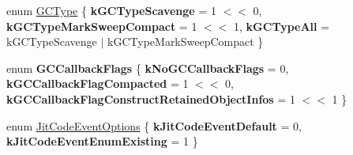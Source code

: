 \begin{DoxyCompactItemize}
\item 
enum \hyperlink{namespacev8_ac109d6f27e0c0f9ef4e98bcf7a806cf2}{G\+C\+Type} \{ {\bfseries k\+G\+C\+Type\+Scavenge} = 1 $<$$<$ 0, 
{\bfseries k\+G\+C\+Type\+Mark\+Sweep\+Compact} = 1 $<$$<$ 1, 
{\bfseries k\+G\+C\+Type\+All} = k\+G\+C\+Type\+Scavenge $\vert$ k\+G\+C\+Type\+Mark\+Sweep\+Compact
 \}
\item 
\hypertarget{namespacev8_a247c37a849f4d6c293b9b16e94e1944b}{}enum {\bfseries G\+C\+Callback\+Flags} \{ {\bfseries k\+No\+G\+C\+Callback\+Flags} = 0, 
{\bfseries k\+G\+C\+Callback\+Flag\+Compacted} = 1 $<$$<$ 0, 
{\bfseries k\+G\+C\+Callback\+Flag\+Construct\+Retained\+Object\+Infos} = 1 $<$$<$ 1
 \}\label{namespacev8_a247c37a849f4d6c293b9b16e94e1944b}

\item 
enum \hyperlink{namespacev8_a06f34fa4fa4cfc8518366808d1d461c1}{Jit\+Code\+Event\+Options} \{ {\bfseries k\+Jit\+Code\+Event\+Default} = 0, 
{\bfseries k\+Jit\+Code\+Event\+Enum\+Existing} = 1
 \}
\end{DoxyCompactItemize}
